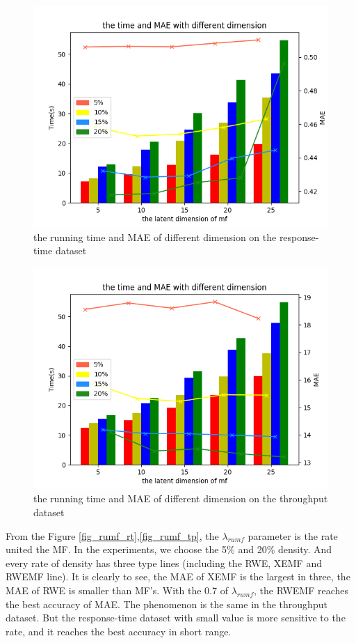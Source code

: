 \documentclass[conference]{IEEEtran}
\begin{document}
\begin{figure}[H] 
\centering  
\includegraphics[width=0.45\paperwidth]{timae_rt.png}  
\caption{the running time and MAE of different dimension on the response-time dataset }  
\label{fig_timae_rt}  
\end{figure} 

\begin{figure}[H] 
\centering  
\includegraphics[width=0.45\paperwidth]{timae_tp.png}  
\caption{the running time and MAE of different dimension on the throughput dataset }
\label{fig_timae_tp}  
\end{figure} 

\par From the Figure \ref{fig_rumf_rt},\ref{fig_rumf_tp}, the $\lambda_{rumf}$ parameter is the rate united the MF. In the experiments, we choose the 5\% and 20\% density. And every rate of density has three type lines (including the RWE, XEMF and RWEMF line). It is clearly to see, the MAE of XEMF is the largest in three, the MAE of RWE is smaller than MF's. With the 0.7 of $\lambda_{rumf}$, the RWEMF reaches the best accuracy of MAE. The phenomenon is the same in the throughput dataset. But the response-time dataset with small value is more sensitive to the rate, and it reaches the best accuracy in short range. 
\end{document}
